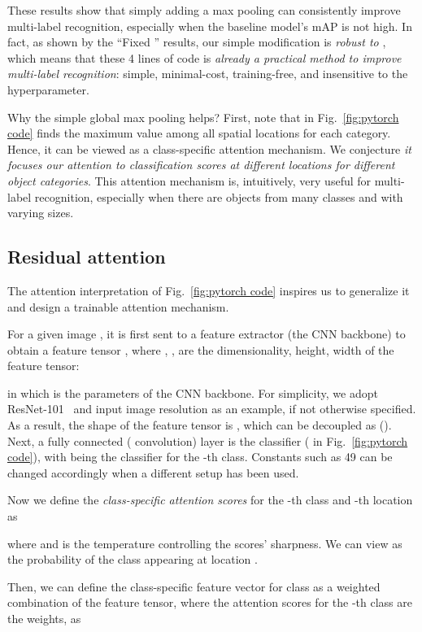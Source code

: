 \documentclass[10pt,twocolumn,letterpaper]{article}
\begin{document}
These results show that simply adding a max pooling can consistently improve multi-label recognition, especially when the baseline model's mAP is not high. In fact, as shown by the ``Fixed '' results, our simple modification is \emph{robust to }, which means that these 4 lines of code is \emph{already a practical method to improve multi-label recognition}: simple, minimal-cost, training-free, and insensitive to the hyperparameter.

Why the simple global max pooling helps? First, note that  in Fig.~\ref{fig:pytorch code} finds the maximum value among all spatial locations for each category. Hence, it can be viewed as a class-specific attention mechanism. We conjecture \emph{it focuses our attention to classification scores at different locations for different object categories}. This attention mechanism is, intuitively, very useful for multi-label recognition, especially when there are objects from many classes and with varying sizes.

\subsection{Residual attention}

The attention interpretation of Fig.~\ref{fig:pytorch code} inspires us to generalize it and design a trainable attention mechanism.

For a given image , it is first sent to a feature extractor (the CNN backbone)  to obtain a feature tensor , where , ,  are the dimensionality, height, width of the feature tensor:

in which  is the parameters of the CNN backbone. For simplicity, we adopt ResNet-101~\cite{ResNet} and input image resolution  as an example, if not otherwise specified. As a result, the shape of the feature tensor  is , which can be decoupled as  (). Next, a fully connected ( convolution) layer is the classifier ( in Fig.~\ref{fig:pytorch code}), with  being the classifier for the -th class. Constants such as 49 can be changed accordingly when a different setup has been used.

Now we define the \emph{class-specific attention scores} for the -th class and -th location as

where  and  is the temperature controlling the scores' sharpness. We can view  as the probability of the class  appearing at location .

Then, we can define the class-specific feature vector for class  as a weighted combination of the feature tensor, where the attention scores for the -th class   are the weights, as
\end{document}
